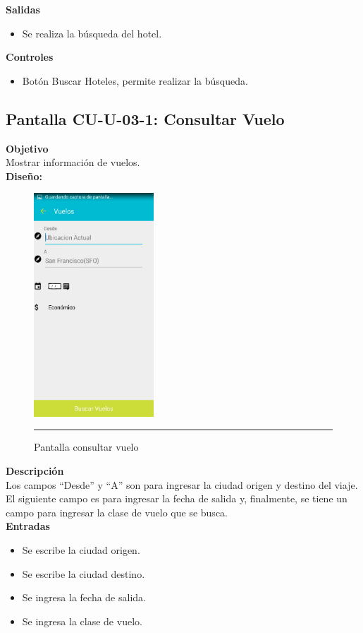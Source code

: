 \textbf{Salidas}
\begin{itemize}
\item Se realiza la búsqueda del hotel.
\end{itemize}

\textbf{Controles}
\begin{itemize}
\item Botón Buscar Hoteles, permite realizar la búsqueda.
\end{itemize}
\clearpage
\hypertarget{CU-U-03-1}{}
\subsection{Pantalla CU-U-03-1: Consultar Vuelo}
\textbf{Objetivo}\\
Mostrar información de vuelos. \\

\textbf{Diseño:}
\begin{figure}[h]
	\centering
		\includegraphics[width=0.4\textwidth]{Figuras/intConsultarVuelo.png}
		\rule{30em}{0.5pt}
	\caption[Pantalla consultar vuelo]{Pantalla consultar vuelo}
	\label{fig:intHoteles}
\end{figure}

\textbf{Descripción} \\
Los campos ``Desde'' y ``A'' son para ingresar la ciudad origen y destino del viaje. El siguiente campo es para ingresar la fecha de salida y, finalmente, se tiene un campo para ingresar la clase de vuelo que se busca. \\

\textbf{Entradas}
\begin{itemize}
\item Se escribe la ciudad origen.
\item Se escribe la ciudad destino.
\item Se ingresa la fecha de salida.
\item Se ingresa la clase de vuelo.
\end{itemize}

